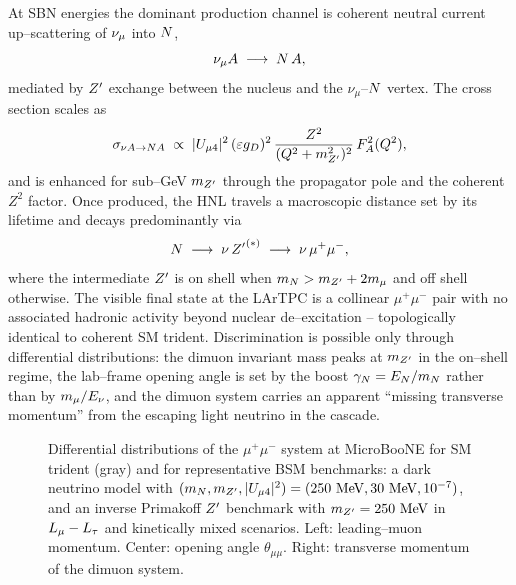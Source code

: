 At SBN energies the dominant production channel is coherent neutral
current up--scattering of $\nu_\mu$ into $N$,
\begin{equation}
  \nu_\mu A \;\longrightarrow\; N\, A,
  \label{eq:upscatter}
\end{equation}
mediated by $Z^{\prime}$ exchange between the nucleus and the $\nu_\mu$--$N$
vertex.  The cross section scales as
\begin{equation}
  \sigma_{\nu A \to N A}
  \;\propto\; |U_{\mu 4}|^2\, (\varepsilon g_D)^2\,
  \frac{Z^2}{(Q^2 + m_{Z^{\prime}}^2)^2}\, F_A^2(Q^2),
  \label{eq:upscatter-xsec}
\end{equation}
and is enhanced for sub--GeV $m_{Z^{\prime}}$ through the propagator pole and the
coherent $Z^2$ factor.  Once produced, the HNL travels a macroscopic
distance set by its lifetime and decays predominantly via
\begin{equation}
  N \;\longrightarrow\; \nu\, {Z^{\prime}}^{(*)}
  \;\longrightarrow\; \nu\, \mu^+ \mu^-,
\end{equation}
where the intermediate $Z^{\prime}$ is on shell when $m_N > m_{Z^{\prime}} + 2m_\mu$ and
off shell otherwise.  The visible final state at the LArTPC is a
collinear $\mu^+\mu^-$ pair with no associated hadronic activity beyond
nuclear de--excitation -- topologically identical to coherent SM
trident.  Discrimination is possible only through differential
distributions: the dimuon invariant mass peaks at $m_{Z^{\prime}}$ in the
on--shell regime, the lab--frame opening angle is set by the boost
$\gamma_N = E_N / m_N$ rather than by $m_\mu / E_\nu$, and the dimuon
system carries an apparent ``missing transverse momentum'' from the
escaping light neutrino in the cascade.

\begin{figure}[t]
  \centering
  \caption{Differential distributions of the $\mu^+\mu^-$ system at
    MicroBooNE for SM trident (gray) and for representative BSM
    benchmarks: a dark neutrino model with
    $(m_N, m_{Z^{\prime}}, |U_{\mu 4}|^2) = (250~\text{MeV}, 30~\text{MeV}, 10^{-7})$,
    and an inverse Primakoff $Z^{\prime}$ benchmark with $m_{Z^{\prime}} = 250~\text{MeV}$
    in $L_\mu - L_\tau$ and kinetically mixed scenarios.  Left: leading--muon
    momentum.  Center: opening angle $\theta_{\mu\mu}$.  Right:
    transverse momentum of the dimuon system.}
  \label{fig:kindist}
\end{figure}

